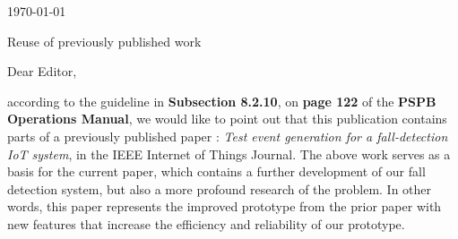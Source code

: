 \documentclass[parskip]{scrartcl}
\begin{document}
 
\pagestyle{empty}

\begin{flushright}
    \Large
    \today
\end{flushright}

\begin{center}
    \huge
    Reuse of previously published work \\
    \vspace{0.4cm}

\end{center}
 
    \vspace{0.8cm}

    \normalsize

Dear Editor,

according to the guideline in \textbf{Subsection 8.2.10}, on \textbf{page 122} of the \textbf{PSPB Operations Manual}, we would like to point out that this publication contains parts of a previously published paper \cite{LorenaFall}: \textit{Test event generation for a fall-detection IoT system}, in the IEEE Internet of Things Journal. The above work \cite{LorenaFall} serves as a basis for the current paper, which contains a further development of our fall detection system, but also a more profound research of the problem. In other words, this paper represents the improved prototype from the prior paper \cite{LorenaFall} with new features that increase the efficiency and reliability of our prototype.
\end{document}
